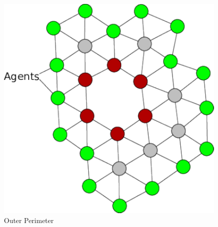 \documentclass[preprint,12pt]{elsarticle}
\begin{document}
\begin{figure}
\begin{center}
\includegraphics{figures/PerimeterBots1}
\end{center}
\caption{Outer Perimeter\label{fig:PerimeterBots1}}
\end{figure}

\end{document}
